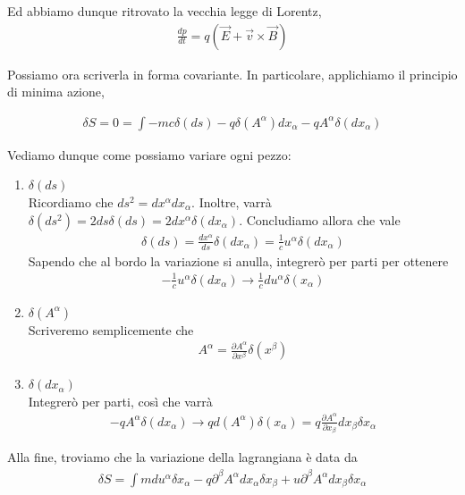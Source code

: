\documentclass{report}
\begin{document}
Ed abbiamo dunque ritrovato la vecchia legge di Lorentz, 
\begin{align}
    \frac{dp}{dt} = q(\vec{E} + \vec{v}\times \vec{B})
\end{align}

Possiamo ora scriverla in forma covariante. In particolare, applichiamo il principio di minima azione,

\begin{align}
    \delta S = 0 = \int -mc \delta(ds) - q\delta(A^\alpha)dx_\alpha - qA^\alpha \delta(dx_\alpha)
\end{align}

Vediamo dunque come possiamo variare ogni pezzo: 
\begin{enumerate}
    \item \(\delta(ds)\) \\
    Ricordiamo che \(ds^2 = dx^\alpha dx_\alpha\). Inoltre, varrà \(\delta(ds^2) = 2ds\delta(ds) = 2 dx^\alpha \delta(dx_\alpha) \). Concludiamo allora che vale 
    \begin{align}
        \delta(ds) = \frac{dx^\alpha}{ds}\delta(dx_\alpha) = \frac{1}{c}u^{\alpha}\delta(dx_\alpha)
    \end{align}
    Sapendo che al bordo la variazione si anulla, integrerò per parti per ottenere 
    \begin{align}
        -\frac{1}{c}u^{\alpha}\delta(dx_\alpha) \rightarrow \frac{1}{c}du^\alpha \delta(x_\alpha)
    \end{align}
    \item \(\delta(A^{\alpha})\) \\
    Scriveremo semplicemente che 
    \begin{align}
        A^{\alpha} = \frac{\partial A^\alpha}{\partial x^\beta}\delta (x^\beta)
    \end{align}
    \item \(\delta(dx_\alpha)\) \\
    Integrerò per parti, così che varrà 
    \begin{align}
        - qA^\alpha \delta(dx_\alpha) \rightarrow q d(A^{\alpha})\delta(x_\alpha) = q \frac{\partial A^\alpha}{\partial x_\beta}dx_\beta \delta x_\alpha
    \end{align}
\end{enumerate}

Alla fine, troviamo che la variazione della lagrangiana è data da 
\begin{align}
    \delta S = \int m du^\alpha \delta x_\alpha -q\partial^\beta A^\alpha dx_\alpha \delta x_\beta + u \partial^\beta A^\alpha dx_\beta \delta x_\alpha
\end{align}
\end{document}
